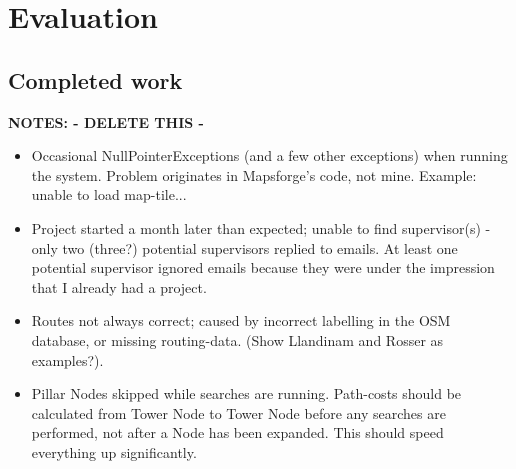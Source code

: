 \chapter{Evaluation}





\section{Completed work}
\textbf{NOTES: - DELETE THIS -}
\begin{itemize}
	\item Occasional NullPointerExceptions (and a few other exceptions) when running the system. Problem originates in Mapsforge's code, not mine. Example: unable to load map-tile...
	\item Project started a month later than expected; unable to find supervisor(s) - only two (three?) potential supervisors replied to emails.
	\subitem At least one potential supervisor ignored emails because they were under the impression that I already had a project.
	\item Routes not always correct; caused by incorrect labelling in the OSM database, or missing routing-data. (Show Llandinam and Rosser as examples?).
	\item Pillar Nodes skipped while searches are running. Path-costs should be calculated from Tower Node to Tower Node before any searches are performed, not after a Node has been expanded. This should speed everything up significantly.
\end{itemize}

